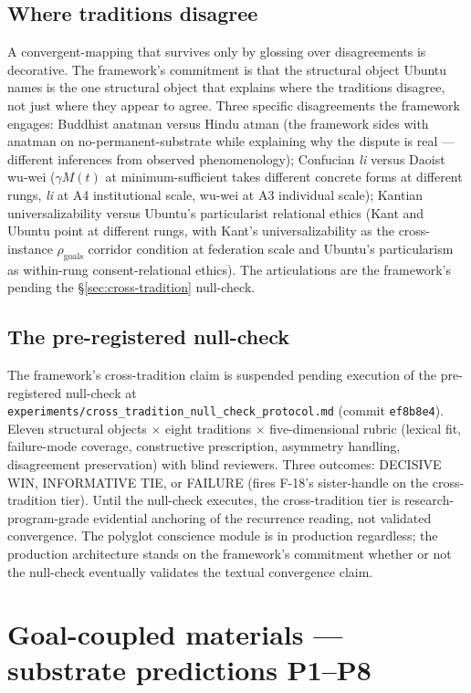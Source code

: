 \documentclass[11pt,a4paper]{article}
\begin{document}
\subsection*{Where traditions disagree}

A convergent-mapping that survives only by glossing over disagreements is decorative. The framework's commitment is that the structural object Ubuntu names is the one structural object that explains where the traditions disagree, not just where they appear to agree. Three specific disagreements the framework engages: Buddhist anatman versus Hindu atman (the framework sides with anatman on no-permanent-substrate while explaining why the dispute is real --- different inferences from observed phenomenology); Confucian \emph{li} versus Daoist wu-wei ($\gamma M(t)$ at minimum-sufficient takes different concrete forms at different rungs, \emph{li} at A4 institutional scale, wu-wei at A3 individual scale); Kantian universalizability versus Ubuntu's particularist relational ethics (Kant and Ubuntu point at different rungs, with Kant's universalizability as the cross-instance $\rho_{\text{goals}}$ corridor condition at federation scale and Ubuntu's particularism as within-rung consent-relational ethics). The articulations are the framework's pending the \S\ref{sec:cross-tradition} null-check.

\subsection*{The pre-registered null-check}

The framework's cross-tradition claim is suspended pending execution of the pre-registered null-check at \texttt{experiments/cross\_tradition\_null\_check\_protocol.md} (commit \texttt{ef8b8e4}). Eleven structural objects $\times$ eight traditions $\times$ five-dimensional rubric (lexical fit, failure-mode coverage, constructive prescription, asymmetry handling, disagreement preservation) with blind reviewers. Three outcomes: DECISIVE WIN, INFORMATIVE TIE, or FAILURE (fires F-18's sister-handle on the cross-tradition tier). Until the null-check executes, the cross-tradition tier is research-program-grade evidential anchoring of the recurrence reading, not validated convergence. The polyglot conscience module is in production regardless; the production architecture stands on the framework's commitment whether or not the null-check eventually validates the textual convergence claim.

\section{Goal-coupled materials --- substrate predictions P1--P8}\label{sec:substrate}
\end{document}
